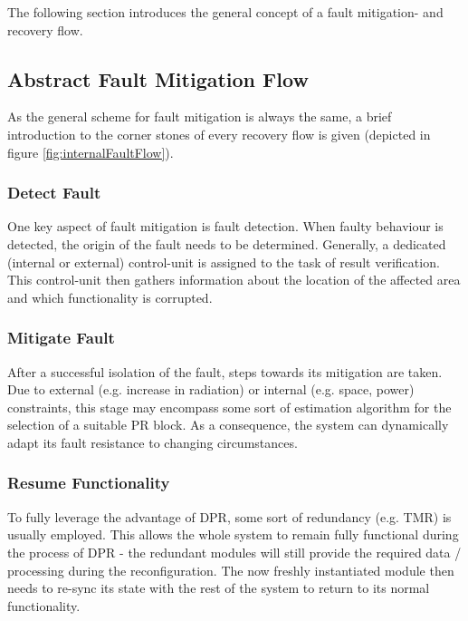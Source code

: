 The following section introduces the general concept of a fault mitigation- and recovery flow. 

\subsection{Abstract Fault Mitigation Flow}\label{AbstractFaultMitigationFlow}
As the general scheme for fault mitigation is always the same, a brief introduction to the corner stones of every recovery flow is given (depicted in figure \ref{fig:internalFaultFlow}). 

\subsubsection{Detect Fault}
    One key aspect of fault mitigation is fault detection. 
    When faulty behaviour is detected, the origin of the fault needs to be determined.
    Generally, a dedicated (internal or external) control-unit is assigned to the task of result verification.
    This control-unit then gathers information about the location of the affected area and which functionality is corrupted.
\subsubsection{Mitigate Fault}
    After a successful isolation of the fault, steps towards its mitigation are taken.
    Due to external (e.g. increase in radiation) or internal (e.g. space, power) constraints, this stage may encompass some sort of estimation algorithm for the selection of a suitable \gls{PR} block.
    As a consequence, the system can dynamically adapt its fault resistance to changing circumstances.
\subsubsection{Resume Functionality}
    To fully leverage the advantage of \gls{DPR}, some sort of redundancy (e.g. \gls{TMR}) is usually employed.
    This allows the whole system to remain fully functional during the process of \gls{DPR} - the redundant modules will still provide the required data / processing during the reconfiguration. 
    The now freshly instantiated module then needs to re-sync its state with the rest of the system to return to its normal functionality.
